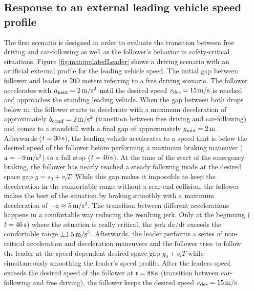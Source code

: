 \documentclass[review]{elsarticle}
\providecommand{\martin}[1]{#1}                  %
\providecommand{\sub}[1]{_{\mathrm{#1}}}  %
\providecommand{\3}{{\ss}}
\begin{document}
\subsection{Response to an external leading vehicle speed profile}
The first scenario is designed in order to evaluate the transition between free driving and car-following as well as the follower's behavior in safety-critical situations. 
Figure \ref{fig:manipulatedLeader} shows a driving scenario with an
artificial external profile for the leading vehicle speed. The initial
gap between 
follower and leader is 200 meters \martin{referring} to a free driving
scenario. The follower accelerates with $a\sub{max} = \unit[2]{m/s^2}$ until
the desired speed $v\sub{des} = \unit[15]{m/s} $ is reached and approaches
the standing leading vehicle. When the gap between both drops below 
\martin{\unit[70]{m}},
the follower starts to decelerate with a maximum
  deceleration of approximately $b_{\rm
  comf} = \unit[2]{m/s^2}$ (transition between free driving and car-following)
and comes to a standstill with a final gap of approximately 
$g\sub{min} = \unit[2]{m}$. Afterwards ($t=\unit[30]{s}$),  the leading vehicle accelerates to a speed
that is below the desired speed of the follower before performing a
maximum braking maneuver ($a=\unit[-9]{m/s^2}$) to a full stop ($t=\unit[46]{s}$). At the time of the start of the
  emergency braking, the follower has nearly reached a steady
  following mode at the desired space gap $g=s_0+v_l T$. While this
  gap makes it impossible to keep the deceleration in the comfortable
  range without a rear-end collision, the follower makes the best of
  the situation by braking smoothly with a maximum deceleration of $-a
  \approx \unit[5]{m/s^2}$.  The transition between different
accelerations happens in a comfortable way reducing the resulting
jerk. Only at the beginning ($t=\unit[46]{s}$) where the situation is
really critical, the jerk $\text{d}a/\text{d}t$ exceeds the comfortable range 
$\pm \unit[1.5]{m/s^3}$. Afterwards, the leader performs a series of
non-critical acceleration and deceleration maneuvers and the follower
tries to follow the leader at the speed dependent desired space gap
$g_0+v_lT$ while simultaneously smoothing the leader's speed profile. After the leaders speed exceeds the desired speed of the follower at $t=\unit[88]{s}$ (transition between car-following and free driving), the follower keeps the desired speed $v\sub{des} = \unit[15]{m/s} $.
\end{document}
